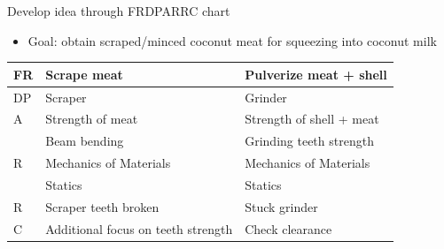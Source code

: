 \documentclass[10pt, svgnames]{beamer}
\begin{document}
\begin{frame}[label={sec:org3a9e25c}]{Develop idea through FRDPARRC chart}
\begin{itemize}
\item Goal: obtain scraped/minced coconut meat for squeezing into coconut milk
\end{itemize}

\begin{center}
  \begin{tabular}{lll}
    \hline
    FR & Scrape meat & Pulverize meat + shell\\
    \hline
    DP & Scraper & Grinder\\
    \hline
    A & Strength of meat & Strength of shell + meat\\
       & Beam bending & Grinding teeth strength\\
    \hline
    R & Mechanics of Materials & Mechanics of Materials\\
       & Statics & Statics\\
    \hline
    R & Scraper teeth broken & Stuck grinder\\
    \hline
    C & Additional focus on teeth strength & Check clearance\\
    \hline
  \end{tabular}
\end{center}
\end{frame}
\end{document}
